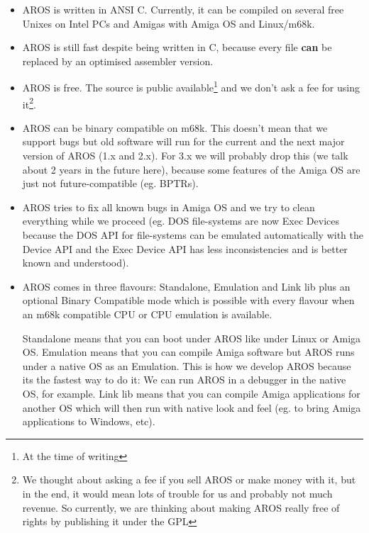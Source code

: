 \begin{itemize}
\item AROS is written in ANSI C. Currently, it can be compiled on several
free Unixes on Intel PCs and Amigas with Amiga OS and Linux/m68k.

\item AROS is still fast despite being written in C, because every file
{\bfseries can} be replaced by an optimised assembler version.

\item AROS is free. The source is public available\footnote{At the time of
writing} and we don't ask a fee for using it\footnote{We thought about
asking a fee if you sell AROS or make money with it, but in the end, it
would mean lots of trouble for us and probably not much revenue. So
currently, we are thinking about making AROS really free of rights by
publishing it under the GPL}.

\item AROS can be binary compatible on m68k. This doesn't mean that we
support bugs but old software will run for the current and the next major
version of AROS (1.x and 2.x). For 3.x we will probably drop this (we talk
about 2 years in the future here), because some features of the Amiga OS are
just not future-compatible (eg. BPTRs).

\item AROS tries to fix all known bugs in Amiga OS and we try to clean
everything while we proceed (eg. DOS file-systems are now Exec Devices
because the DOS API for file-systems can be emulated automatically with the
Device API and the Exec Device API has less inconsistencies and is better
known and understood).

\item AROS comes in three flavours: Standalone, Emulation and Link lib plus
an optional Binary Compatible mode which is possible with every flavour
when an m68k compatible CPU or CPU emulation is available.

Standalone means that you can boot under AROS like under Linux or Amiga OS.
Emulation means that you can compile Amiga software but AROS runs under a
native OS as an Emulation. This is how we develop AROS because its the
fastest way to do it: We can run AROS in a debugger in the native OS, for
example. Link lib means that you can compile Amiga applications for another
OS which will then run with native look and feel (eg. to bring Amiga applications to
Windows, etc).

\end{itemize}

